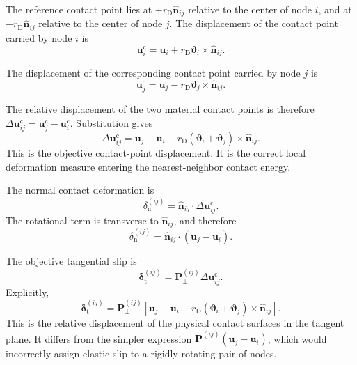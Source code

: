 The reference contact point lies at $+r_{\mathrm{D}}\hat{\mathbf{n}}_{ij}$ relative to the center of node $i$, and at $-r_{\mathrm{D}}\hat{\mathbf{n}}_{ij}$ relative to the center of node $j$. The displacement of the contact point carried by node $i$ is
\begin{equation}
    \mathbf{u}_i^{\mathrm{c}} = \mathbf{u}_i + r_{\mathrm{D}} \boldsymbol{\vartheta}_i \times \hat{\mathbf{n}}_{ij}.
\end{equation}

The displacement of the corresponding contact point carried by node $j$ is
\begin{equation}
    \mathbf{u}_j^{\mathrm{c}} = \mathbf{u}_j - r_{\mathrm{D}} \boldsymbol{\vartheta}_j \times \hat{\mathbf{n}}_{ij}.
\end{equation}

The relative displacement of the two material contact points is therefore $\Delta\mathbf{u}_{ij}^{\mathrm{c}} = \mathbf{u}_j^{\mathrm{c}} - \mathbf{u}_i^{\mathrm{c}}$. Substitution gives
\begin{equation}
    \Delta\mathbf{u}_{ij}^{\mathrm{c}} = \mathbf{u}_j - \mathbf{u}_i - r_{\mathrm{D}} (\boldsymbol{\vartheta}_i+\boldsymbol{\vartheta}_j) \times \hat{\mathbf{n}}_{ij}.
\end{equation}
This is the objective contact-point displacement. It is the correct local deformation measure entering the nearest-neighbor contact energy.

The normal contact deformation is
\begin{equation}
    \delta_{\mathrm{n}}^{(ij)} = \hat{\mathbf{n}}_{ij} \cdot \Delta\mathbf{u}_{ij}^{\mathrm{c}}.
\end{equation}
The rotational term is transverse to $\hat{\mathbf{n}}_{ij}$, and therefore
\begin{equation}
    \delta_{\mathrm{n}}^{(ij)} = \hat{\mathbf{n}}_{ij} \cdot (\mathbf{u}_j-\mathbf{u}_i).
\end{equation}

The objective tangential slip is
\begin{equation}
    \boldsymbol{\delta}_{\mathrm{t}}^{(ij)} = \mathbf{P}_{\perp}^{(ij)} \Delta\mathbf{u}_{ij}^{\mathrm{c}}.
\end{equation}
Explicitly,
\begin{equation}
    \boldsymbol{\delta}_{\mathrm{t}}^{(ij)} = \mathbf{P}_{\perp}^{(ij)} \left[ \mathbf{u}_j-\mathbf{u}_i - r_{\mathrm{D}} (\boldsymbol{\vartheta}_i+\boldsymbol{\vartheta}_j) \times \hat{\mathbf{n}}_{ij} \right].
\end{equation}
This is the relative displacement of the physical contact surfaces in the tangent plane. It differs from the simpler expression $\mathbf{P}_{\perp}^{(ij)}(\mathbf{u}_j-\mathbf{u}_i)$, which would incorrectly assign elastic slip to a rigidly rotating pair of nodes.

